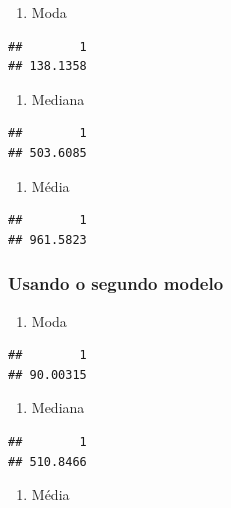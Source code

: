 \documentclass[]{article}
\providecommand{\tightlist}{%
  \setlength{\itemsep}{0pt}\setlength{\parskip}{0pt}}
\begin{document}
\begin{enumerate}
\def\labelenumi{\alph{enumi}.}
\tightlist
\item
  Moda
\end{enumerate}

\begin{verbatim}
##        1 
## 138.1358
\end{verbatim}

\begin{enumerate}
\def\labelenumi{\alph{enumi}.}
\setcounter{enumi}{1}
\tightlist
\item
  Mediana
\end{enumerate}

\begin{verbatim}
##        1 
## 503.6085
\end{verbatim}

\begin{enumerate}
\def\labelenumi{\alph{enumi}.}
\setcounter{enumi}{2}
\tightlist
\item
  Média
\end{enumerate}

\begin{verbatim}
##        1 
## 961.5823
\end{verbatim}

\subsubsection{Usando o segundo modelo}\label{usando-o-segundo-modelo}

\begin{enumerate}
\def\labelenumi{\alph{enumi}.}
\tightlist
\item
  Moda
\end{enumerate}

\begin{verbatim}
##        1 
## 90.00315
\end{verbatim}

\begin{enumerate}
\def\labelenumi{\alph{enumi}.}
\setcounter{enumi}{1}
\tightlist
\item
  Mediana
\end{enumerate}

\begin{verbatim}
##        1 
## 510.8466
\end{verbatim}

\begin{enumerate}
\def\labelenumi{\alph{enumi}.}
\setcounter{enumi}{2}
\tightlist
\item
  Média
\end{enumerate}
\end{document}
